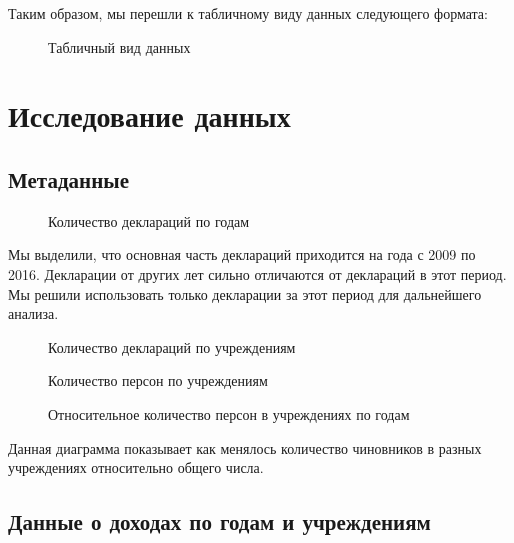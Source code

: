 \documentclass[a4paper,14pt]{article}
\begin{document}
  \pagebreak

  Таким образом, мы перешли к табличному виду данных следующего формата:

  \begin{figure}[H]
    \centering
    \caption{Табличный вид данных}
  \end{figure}

  \section{Исследование данных}

  \subsection{Метаданные}

  \begin{figure}[H]
    \centering
    \caption{Количество деклараций по годам}
  \end{figure}

  Мы выделили, что основная часть деклараций приходится на года с 2009 по 2016. Декларации от других лет сильно отличаются от деклараций в этот период. Мы решили использовать только декларации за этот период для дальнейшего анализа.

  \begin{figure}[H]
    \centering
    \caption{Количество деклараций по учреждениям}
  \end{figure}

  \begin{figure}[H]
    \centering
    \caption{Количество персон по учреждениям}
  \end{figure}

  \begin{figure}[H]
    \centering
    \caption{Относительное количество персон в учреждениях по годам}
  \end{figure}

  Данная диаграмма показывает как менялось количество чиновников в разных учреждениях относительно общего числа.

  \subsection{Данные о доходах по годам и учреждениям}
\end{document}
